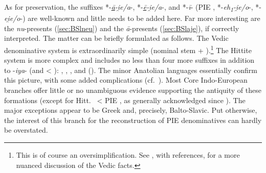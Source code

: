 \documentclass[output=paper,colorlinks,citecolor=brown]{langscibook}
\begin{document}
As for preservation, the suffixes *-\textit{\underline{ā}-i̯e/a}-, *-\textit{\underline{ē}-i̯e/a}-, and *-\textit{ī}- (PIE , *\nobreakdash-\textit{eh\textsubscript{1}-i̯e/o}-, *-\textit{ei̯e/o}-) are well-known and little needs to be added here. Far more interesting are the \textit{nu}-presents  (\ref{sec:BSlneu}) and the \textit{ā}-presents (\ref{sec:BSlaje}), if correctly interpreted. The matter can be briefly formulated as follows. The Vedic denominative system  is extraordinarily simple (nominal stem + ).\footnote{This is of course an oversimplification. See \citet{Yakubovich2014}, with references, for a more nuanced discussion of the Vedic facts.} The Hittite system is more complex and includes no less than four more suffixes in addition to -\textit{iya}- (and  < ): , , , and  (\citealt[175--179]{Hoffner2008}). The minor Anatolian languages essentially confirm this picture, with some added complications (cf.\ \citealt[547--552]{Sasseville2021}). Most Core Indo-European branches offer little or no unambiguous evidence supporting the antiquity of these formations (except for Hitt.\  < PIE , as generally acknowledged since \citealt{Watkins1971}). The major exceptions appear to be Greek and, precisely, Balto-Slavic. Put otherwise, the interest of this branch for the reconstruction of PIE denominatives can hardly be overstated.
\end{document}
